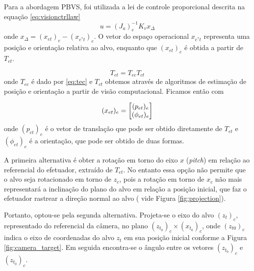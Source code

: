 Para a abordagem PBVS, foi utilizada a lei de controle proporcional descrita na equação \eqref{eq:visionctrllaw}
\begin{equation*} 
{u} = ({J}_a)_e^{-1}{K}_v x_\Delta%
\end{equation*}
onde $x_\Delta = ({x}_{et})_e - ({x}_{e^*t})_e$. O vetor do espaço operacional ${x}_{e^*t}$ representa uma posição e orientação relativa ao alvo, enquanto que $({x}_{et})_e$ é obtida a partir de $T_{et}$.

\begin{equation}
{T}_{et} = {T}_{ec} {T}_{ct}
\end{equation}
onde ${T}_{ec}$ é dado por \eqref{eq:tec} e ${T}_{ct}$ obtemos através de algoritmos de estimação de posição e orientação a partir de visão computacional. Ficamos então com

\begin{equation}
({x}_{et})_e = \begin{bmatrix} ({p}_{et})_e \\ (\phi_{et})_e \end{bmatrix}
\end{equation}
onde $({p}_{et})_e$ é o vetor de translação que pode ser obtido diretamente de ${T}_{et}$ e  $(\phi_{et})_e$ é a orientação, que pode ser obtido de duas formas.

A primeira alternativa é obter a rotação em torno do eixo $x$ (\textit{pitch}) em relação ao referencial do efetuador, extraído de ${T}_{et}$. No entanto essa opção não permite que o alvo seja rotacionado em torno de ${z}_c$, pois a rotação em torno de ${x}_c$ não mais representará a inclinação do plano do alvo em relação a posição inicial, que faz o efetuador rastrear a direção normal ao alvo ( vide Figura \ref{fig:projection}). 

Portanto, optou-se pela segunda alternativa. Projeta-se o eixo do alvo $({z}_t)_c$, representado do referencial da câmera, no plano $({z}_{t_0})_c \times ({x}_{t_0})_c$, onde $({z}_{t0})_c$ indica o eixo de coordenadas do alvo $z_t$ em sua posição inicial conforme a Figura \ref{fig:camera_target}. Em seguida encontra-se o ângulo entre os vetores $({z}_{t_0})_c$ e $({z}_{t_0})_c$. 


